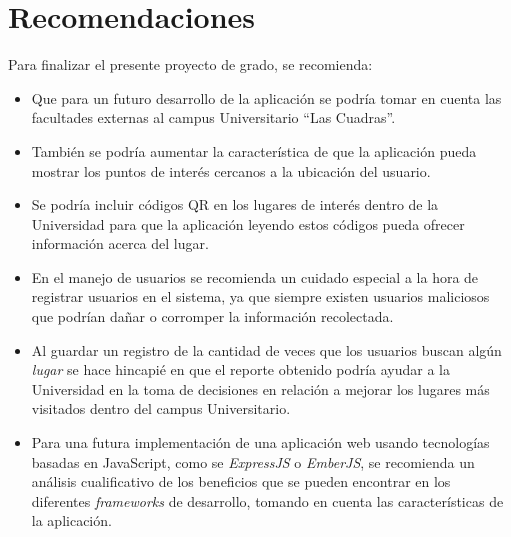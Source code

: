 \section{Recomendaciones}

Para finalizar el presente proyecto de grado, se recomienda:

\begin{itemize}
\item Que para un futuro desarrollo de la aplicación se podría tomar en cuenta las facultades externas al campus Universitario ``Las Cuadras''.

\item También se podría aumentar la característica de que la aplicación pueda mostrar los puntos de interés cercanos a la ubicación del usuario.

\item Se podría incluir códigos QR en los lugares de interés dentro de la Universidad para que la aplicación leyendo estos códigos pueda ofrecer información acerca del lugar.

\item En el manejo de usuarios se recomienda un cuidado especial a la hora de registrar usuarios en el sistema, ya que siempre existen usuarios maliciosos que podrían dañar o corromper la información recolectada.

\item Al guardar un registro de la cantidad de veces que los usuarios buscan algún \emph{lugar} se hace hincapié en que el reporte obtenido podría ayudar a la Universidad en la toma de decisiones en relación a mejorar los lugares más visitados dentro del campus Universitario.


\item Para una futura implementación de una aplicación web usando tecnologías basadas en JavaScript, como se \emph{ExpressJS} o \emph{EmberJS}, se recomienda un análisis cualificativo de los beneficios que se pueden encontrar en los diferentes \emph{frameworks} de desarrollo, tomando en cuenta las características de la aplicación.


\end{itemize}
